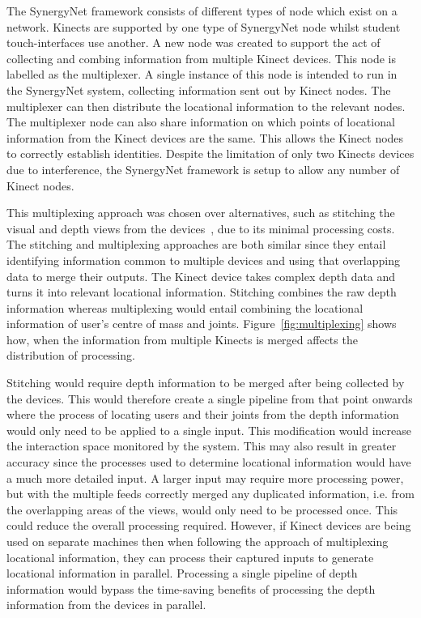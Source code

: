 \documentclass[manuscript, review, screen]{acmart}
\begin{document}
The SynergyNet framework consists of different types of node which exist on a network.
Kinects are supported by one type of SynergyNet node whilst student touch-interfaces use another.
A new node was created to support the act of collecting and combing information from multiple Kinect devices.
This node is labelled as the multiplexer.
A single instance of this node is intended to run in the SynergyNet system, collecting information sent out by Kinect nodes.
The multiplexer can then distribute the locational information to the relevant nodes.
The multiplexer node can also share information on which points of locational information from the Kinect devices are the same.
This allows the Kinect nodes to correctly establish identities.
Despite the limitation of only two Kinects devices due to interference, the SynergyNet framework is setup to allow any number of Kinect nodes.

This multiplexing approach was chosen over alternatives, such as stitching the visual and depth views from the devices~\cite{Dubois2011}, due to its minimal processing costs.
The stitching and multiplexing approaches are both similar since they entail identifying information common to multiple devices and using that overlapping data to merge their outputs.
The Kinect device takes complex depth data and turns it into relevant locational information.
Stitching combines the raw depth information whereas multiplexing would entail combining the locational information of user's centre of mass and joints.
Figure~\ref{fig:multiplexing} shows how, when the information from multiple Kinects is merged affects the distribution of processing.

Stitching would require depth information to be merged after being collected by the devices.
This would therefore create a single pipeline from that point onwards where the process of locating users and their joints from the depth information would only need to be applied to a single input.
This modification would increase the interaction space monitored by the system.
This may also result in greater accuracy since the processes used to determine locational information would have a much more detailed input.
A larger input may require more processing power, but with the multiple feeds correctly merged any duplicated information, i.e. from the overlapping areas of the views, would only need to be processed once.
This could reduce the overall processing required.
However, if Kinect devices are being used on separate machines then when following the approach of multiplexing locational information, they can process their captured inputs to generate locational information in parallel.
Processing a single pipeline of depth information would bypass the time-saving benefits of processing the depth information from the devices in parallel.
\end{document}
